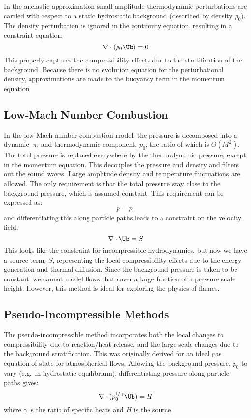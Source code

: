 In the anelastic approximation small amplitude thermodynamic
perturbations are carried with respect to a static hydrostatic
background (described by density $\rho_0$).  The density perturbation
is ignored in the continuity equation, resulting in a constraint
equation:
\begin{equation}
\nabla \cdot (\rho_0 \Ub) = 0
\end{equation}
This properly captures the compressibility effects due to the
stratification of the background. Because there is no evolution
equation for the perturbational density, approximations are made to
the buoyancy term in the momentum equation.

\subsection{Low-Mach Number Combustion}

In the low Mach number combustion model, the pressure is decomposed
into a dynamic, $\pi$, and thermodynamic component, $p_0$, the ratio
of which is $O(M^2)$. The total pressure is replaced everywhere by the
thermodynamic pressure, except in the momentum equation. This
decouples the pressure and density and filters out the sound
waves. Large amplitude density and temperature fluctuations are
allowed. The only requirement is that the total pressure stay close to
the background pressure, which is assumed constant. This requirement
can be expressed as:
\begin{equation}
p = p_0
\end{equation}
and differentiating this along particle paths leads to a constraint on
the velocity field: 
\begin{equation}
\nabla \cdot \Ub = S 
\end{equation}
This looks like the constraint for incompressible hydrodynamics, but
now we have a source term, $S$, representing the local compressibility
effects due to the energy generation and thermal diffusion.  Since the
background pressure is taken to be constant, we cannot model flows
that cover a large fraction of a pressure scale height. However, this
method is ideal for exploring the physics of flames.

\subsection{Pseudo-Incompressible Methods}

The pseudo-incompressible method incorporates both the local changes
to compressibility due to reaction/heat release, and the large-scale
changes due to the background stratification.  This was originally
derived for an ideal gas equation of state for atmospherical flows.
Allowing the background pressure, $p_0$ to vary (e.g.\ in hydrostatic
equilibrium), differentiating pressure along particle paths gives:
\begin{equation}
\nabla \cdot (p_0^{1/\gamma} \Ub) = H
\end{equation}
where $\gamma$ is the ratio of specific heats and $H$ is the source.

